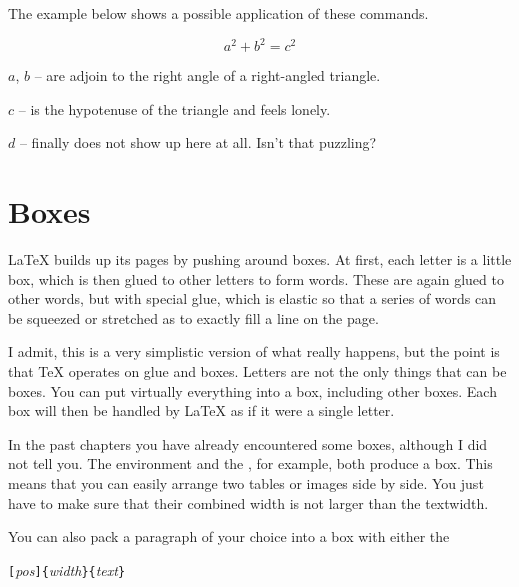 \noindent The example below shows a possible application of these commands.

\begin{example}
\flushleft
\newenvironment{vardesc}[1]{%
  \settowidth{\parindent}{#1:\ }
  \makebox[0pt][r]{#1:\ }}{}

\begin{displaymath}
a^2+b^2=c^2
\end{displaymath}

\begin{vardesc}{Where}$a$, 
$b$ -- are adjoin to the right 
angle of a right-angled triangle.  

$c$ -- is the hypotenuse of 
the triangle and feels lonely.

$d$ -- finally does not show up 
here at all. Isn't that puzzling?
\end{vardesc}
\end{example}

\section{Boxes}
\LaTeX{} builds up its pages by pushing around boxes. At first, each
letter is a little box, which is then glued to other letters to form
words. These are again glued to other words, but with special glue,
which is elastic so that a series of words can be squeezed or
stretched as to exactly fill a line on the page. 

I admit, this is a very simplistic version of what really happens, but the
point is that \TeX{} operates on glue and boxes. Letters are not the only
things that can be boxes. You can put virtually everything into a box,
including other boxes. Each box will then be handled by \LaTeX{} as if it
were a single letter.

In the past chapters you have already encountered some boxes, although I did
not tell you. The  environment and the , for
example, both produce a box. This means that you can easily arrange two
tables or images side by side. You just have to make sure that their
combined width is not larger than the textwidth.

You can also pack a paragraph of your choice into a box with either
the

\begin{lscommand}
\verb|[|\emph{pos}\verb|]{|\emph{width}\verb|}{|\emph{text}\verb|}|
\end{lscommand}

